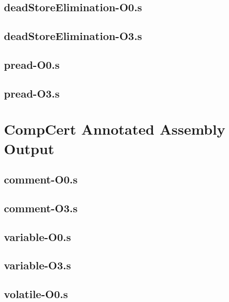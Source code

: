 \begin{appendices}
\subsection{deadStoreElimination-O0.s}

\subsection{deadStoreElimination-O3.s}


\subsection{pread-O0.s}

\subsection{pread-O3.s}


\section{CompCert Annotated Assembly Output}
\label{app:compCertAnnotatedAssembly}
\lstset{language=[x64]Assembler}
\subsection{comment-O0.s}

\subsection{comment-O3.s}


\subsection{variable-O0.s}

\subsection{variable-O3.s}


\subsection{volatile-O0.s}


\end{appendices}
